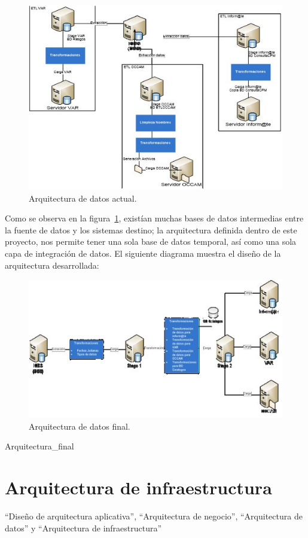 \begin{figure}[htb]
  \begin{center}
    \includegraphics[width=0.8\linewidth]{Arquitecturadatos_actual.jpg}
    \caption{Arquitectura de datos actual.}
    \label{fig:arquitectura-de-datos-actual}
  \end{center}
\end{figure}

Como se observa en la figura~\ref{fig:arquitectura-de-datos-actual}, existían
muchas bases de datos intermedias entre la fuente de datos y los sistemas
destino; la arquitectura definida dentro de este proyecto, nos permite tener una
sola base de datos temporal, así como una sola capa de integración de datos. El
siguiente diagrama muestra el diseño de la arquitectura desarrollada:

\begin{figure}[htb]
  \begin{center}
    \includegraphics[width=0.8\linewidth]{Arquitectura_final.jpg}
    \caption{Arquitectura de datos final.}
    \label{fig:arquitectura-de-datos-final}
  \end{center}
\end{figure}

Arquitectura\_final %

\section{Arquitectura de infraestructura}

``Diseño de arquitectura aplicativa'', ``Arquitectura de negocio'',
``Arquitectura de datos'' y ``Arquitectura de infraestructura''

\cleardoublepage

